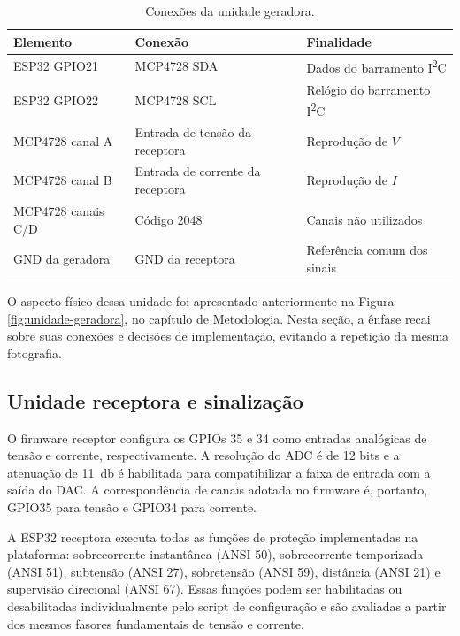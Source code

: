 \begin{table}[H]
  \centering
  \small
  \caption{Conexões da unidade geradora.}
  \label{tab:pinagem-geradora}
  \begin{tabular}{lll}
    \toprule
    Elemento & Conexão & Finalidade \\
    \midrule
    ESP32 GPIO21 & MCP4728 SDA & Dados do barramento I\textsuperscript{2}C \\
    ESP32 GPIO22 & MCP4728 SCL & Relógio do barramento I\textsuperscript{2}C \\
    MCP4728 canal A & Entrada de tensão da receptora & Reprodução de $V$ \\
    MCP4728 canal B & Entrada de corrente da receptora & Reprodução de $I$ \\
    MCP4728 canais C/D & Código 2048 & Canais não utilizados \\
    GND da geradora & GND da receptora & Referência comum dos sinais \\
    \bottomrule
  \end{tabular}
\end{table}

O aspecto físico dessa unidade foi apresentado anteriormente na Figura \ref{fig:unidade-geradora}, no capítulo de Metodologia. Nesta seção, a ênfase recai sobre suas conexões e decisões de implementação, evitando a repetição da mesma fotografia.

\subsection{Unidade receptora e sinalização}

O firmware receptor configura os GPIOs 35 e 34 como entradas analógicas de tensão e corrente, respectivamente. A resolução do ADC é de 12 bits e a atenuação de \SI{11}{\decibel} é habilitada para compatibilizar a faixa de entrada com a saída do DAC. A correspondência de canais adotada no firmware é, portanto, GPIO35 para tensão e GPIO34 para corrente.

A ESP32 receptora executa todas as funções de proteção implementadas na plataforma: sobrecorrente instantânea (ANSI 50), sobrecorrente temporizada (ANSI 51), subtensão (ANSI 27), sobretensão (ANSI 59), distância (ANSI 21) e supervisão direcional (ANSI 67). Essas funções podem ser habilitadas ou desabilitadas individualmente pelo script de configuração e são avaliadas a partir dos mesmos fasores fundamentais de tensão e corrente.

